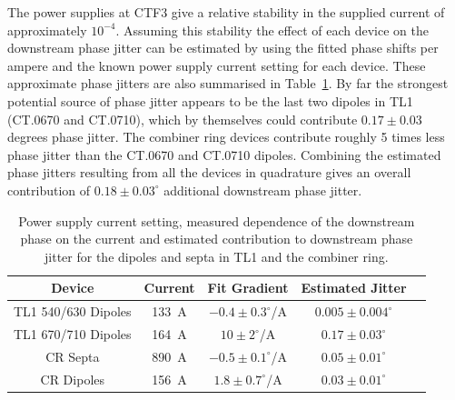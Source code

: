 The power supplies at CTF3 give a relative stability in the supplied current of approximately \(10^{-4}\). Assuming this stability the effect of each device on the downstream phase jitter can be estimated by using the fitted phase shifts per ampere and the known power supply current setting for each device. These approximate phase jitters are also summarised in Table~\ref{t:otherJitSources}. By far the strongest potential source of phase jitter appears to be the last two dipoles in TL1 (CT.0670 and CT.0710), which by themselves could contribute \(0.17\pm0.03\) degrees phase jitter. 
The combiner ring devices contribute roughly 5 times less phase jitter than the CT.0670 and CT.0710 dipoles. 
Combining the estimated phase jitters resulting from all the devices in quadrature gives an overall contribution of \(0.18\pm0.03^\circ\) additional downstream phase jitter.

\begin{table}
  \begin{center}
    \begin{tabular}{| c | c c c | c|}
	   \hline
       Device & Current & Fit Gradient & Estimated Jitter \\ \hline
       TL1 540/630 Dipoles & 133~A & \(-0.4\pm0.3^\circ\)/A & \(0.005\pm0.004^\circ\) \\
       TL1 670/710 Dipoles & 164~A & \(10\pm2^\circ\)/A & \(0.17\pm0.03^\circ\) \\
       CR Septa & 890~A &  \(-0.5\pm0.1^\circ\)/A & \(0.05\pm0.01^\circ\) \\
       CR Dipoles & 156~A & \(1.8\pm0.7^\circ\)/A & \(0.03\pm0.01^\circ\) \\ \hline 
    \end{tabular}
    \caption{Power supply current setting, measured dependence of the downstream phase on the current and estimated contribution to downstream phase jitter for the dipoles and septa in TL1 and the combiner ring.}
  	\label{t:otherJitSources}
  \end{center}
\end{table}

